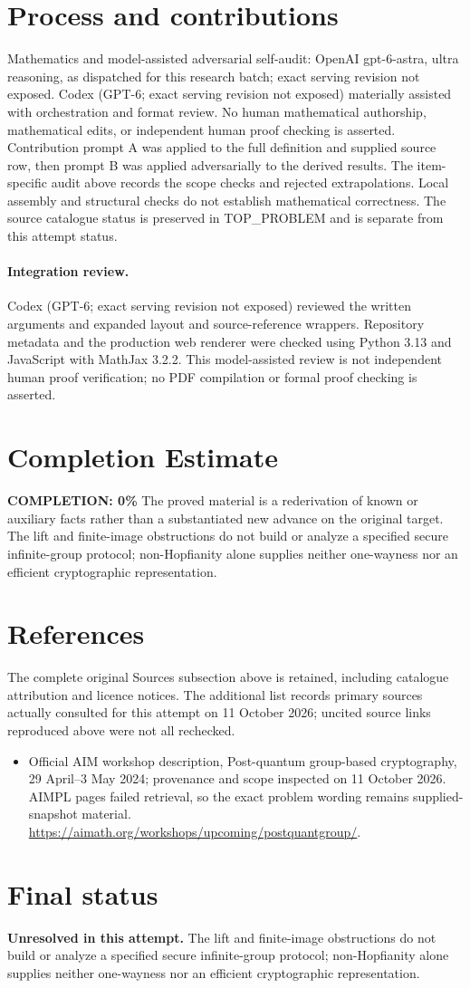\documentclass[11pt]{article}
\begin{document}
\section{Process and contributions}
Mathematics and model-assisted adversarial self-audit: OpenAI gpt-6-astra, ultra reasoning, as dispatched for this research batch; exact serving revision not exposed. Codex (GPT-6; exact serving revision not exposed) materially assisted with orchestration and format review. No human mathematical authorship, mathematical edits, or independent human proof checking is asserted.
Contribution prompt A was applied to the full definition and supplied source row, then prompt B was applied adversarially to the derived results. The item-specific audit above records the scope checks and rejected extrapolations. Local assembly and structural checks do not establish mathematical correctness. The source catalogue status is preserved in TOP\_PROBLEM and is separate from this attempt status.
\paragraph{Integration review.} Codex (GPT-6; exact serving revision not exposed) reviewed the written arguments and expanded layout and source-reference wrappers. Repository metadata and the production web renderer were checked using Python 3.13 and JavaScript with MathJax 3.2.2. This model-assisted review is not independent human proof verification; no PDF compilation or formal proof checking is asserted.

\section{Completion Estimate}
\noindent\textbf{COMPLETION: 0\%}
The proved material is a rederivation of known or auxiliary facts rather than a substantiated new advance on the original target. The lift and finite-image obstructions do not build or analyze a specified secure infinite-group protocol; non-Hopfianity alone supplies neither one-wayness nor an efficient cryptographic representation.
\section{References}
The complete original Sources subsection above is retained, including catalogue attribution and licence notices. The additional list records primary sources actually consulted for this attempt on 11 October 2026; uncited source links reproduced above were not all rechecked.
\begin{itemize}
\item Official AIM workshop description, Post-quantum group-based cryptography, 29 April--3 May 2024; provenance and scope inspected on 11 October 2026. AIMPL pages failed retrieval, so the exact problem wording remains supplied-snapshot material. \url{https://aimath.org/workshops/upcoming/postquantgroup/}.
\end{itemize}
\section{Final status}
\textbf{Unresolved in this attempt.} The lift and finite-image obstructions do not build or analyze a specified secure infinite-group protocol; non-Hopfianity alone supplies neither one-wayness nor an efficient cryptographic representation.
\end{document}
